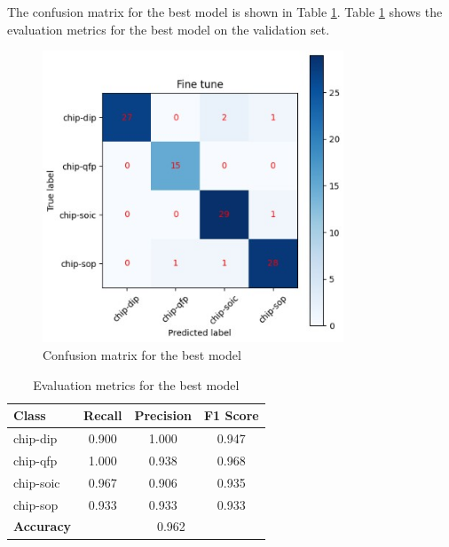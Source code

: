 \documentclass[preprint,12pt,3p,times]{elsarticle}
\begin{document}
The confusion matrix for the best model is shown in Table \ref{fig:confusion_matrix}. Table \ref{tab:metrics} shows the evaluation metrics for the best model on the validation set.

\begin{minipage}[h]{0.48\textwidth}
\begin{figure}[H]
	\centering
	\includegraphics[width=0.8\textwidth]{images/confusion-matrix.jpg}
	\caption{Confusion matrix for the best model}
	\label{fig:confusion_matrix}
\end{figure}
\end{minipage}%
\hfill
\begin{minipage}[h]{0.48\textwidth}
\begin{table}[H]
	\centering
	\begin{tabular}{|l|c|c|c|}
	\hline
	\textbf{Class} & \textbf{Recall} & \textbf{Precision} & \textbf{F1 Score} \\ \hline
	chip-dip & 0.900 & 1.000 & 0.947 \\ \hline
	chip-qfp & 1.000 & 0.938 & 0.968 \\ \hline
	chip-soic & 0.967 & 0.906 & 0.935 \\ \hline
	chip-sop & 0.933 & 0.933 & 0.933 \\ \hline
	\textbf{Accuracy} & \multicolumn{3}{c|}{0.962} \\ \hline
	\end{tabular}
	\caption{Evaluation metrics for the best model}
	\label{tab:metrics}
\end{table}
\end{minipage}
\end{document}
